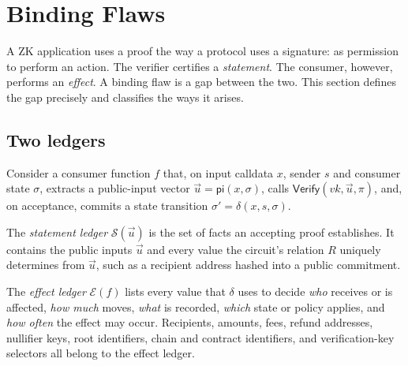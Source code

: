 \section{Binding Flaws}\label{sec:definition}

A ZK application uses a proof the way a protocol uses a signature: as
permission to perform an action. The verifier certifies a \emph{statement}.
The consumer, however, performs an \emph{effect}. A binding flaw is a gap
between the two. This section defines the gap precisely and classifies the
ways it arises.

\subsection{Two ledgers}\label{sec:def-ledgers}

Consider a consumer function $f$ that, on input calldata $x$, sender $s$ and
consumer state $\sigma$, extracts a public-input vector $\vec{u} =
\mathsf{pi}(x,\sigma)$, calls $\mathsf{Verify}(\mathit{vk},\vec{u},\pi)$, and,
on acceptance, commits a state transition $\sigma' = \delta(x,s,\sigma)$.

The \emph{statement ledger} $\mathcal{S}(\vec{u})$ is the set of facts an
accepting proof establishes. It contains the public inputs $\vec{u}$ and every
value the circuit's relation $R$ uniquely determines from $\vec{u}$, such as a
recipient address hashed into a public commitment.

The \emph{effect ledger} $\mathcal{E}(f)$ lists every value that $\delta$ uses
to decide \emph{who} receives or is affected, \emph{how much} moves,
\emph{what} is recorded, \emph{which} state or policy applies, and \emph{how
often} the effect may occur. Recipients, amounts, fees, refund addresses,
nullifier keys, root identifiers, chain and contract identifiers, and
verification-key selectors all belong to the effect ledger.

